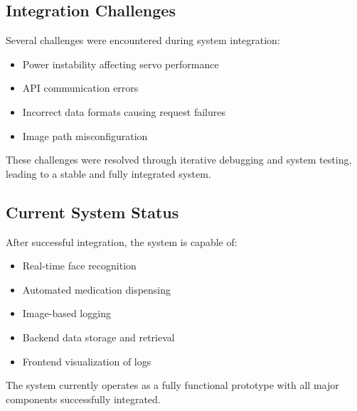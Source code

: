 \subsection{Integration Challenges}

Several challenges were encountered during system integration:

\begin{itemize}
    \item Power instability affecting servo performance
    \item API communication errors
    \item Incorrect data formats causing request failures
    \item Image path misconfiguration
\end{itemize}

These challenges were resolved through iterative debugging and system testing, leading to a stable and fully integrated system.

\subsection{Current System Status}

After successful integration, the system is capable of:

\begin{itemize}
    \item Real-time face recognition
    \item Automated medication dispensing
    \item Image-based logging
    \item Backend data storage and retrieval
    \item Frontend visualization of logs
\end{itemize}

The system currently operates as a fully functional prototype with all major components successfully integrated.